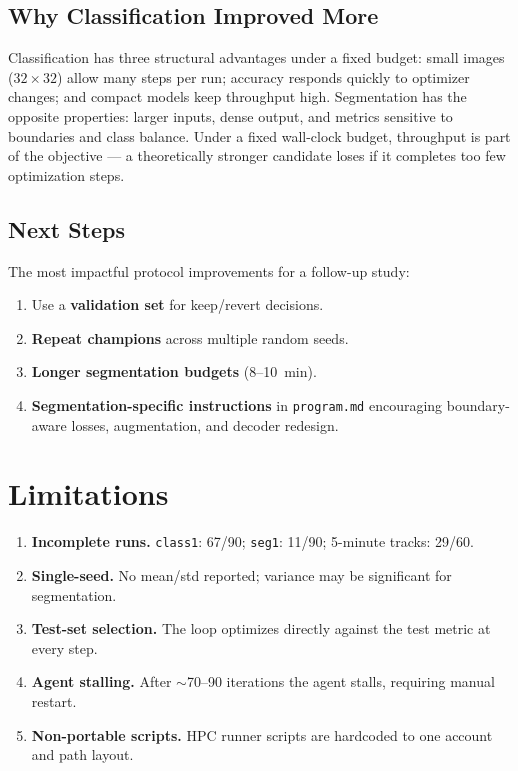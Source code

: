 \documentclass[10pt,twocolumn,letterpaper]{article}
\begin{document}
\subsection{Why Classification Improved More}

Classification has three structural advantages under a fixed budget:
small images ($32\times32$) allow many steps per run; accuracy
responds quickly to optimizer changes; and compact models keep
throughput high.
Segmentation has the opposite properties: larger inputs, dense output,
and metrics sensitive to boundaries and class balance.
Under a fixed wall-clock budget, throughput is part of the objective
--- a theoretically stronger candidate loses if it completes too few
optimization steps.

\subsection{Next Steps}

The most impactful protocol improvements for a follow-up study:
\begin{enumerate}
  \item Use a \textbf{validation set} for keep/revert decisions.
  \item \textbf{Repeat champions} across multiple random seeds.
  \item \textbf{Longer segmentation budgets} (8--10~min).
  \item \textbf{Segmentation-specific instructions} in
    \texttt{program.md} encouraging boundary-aware losses,
    augmentation, and decoder redesign.
\end{enumerate}

\section{Limitations}

\begin{enumerate}
  \item \textbf{Incomplete runs.}
    \texttt{class1}: 67/90; \texttt{seg1}: 11/90;
    5-minute tracks: 29/60.
  \item \textbf{Single-seed.} No mean/std reported; variance may be
    significant for segmentation.
  \item \textbf{Test-set selection.} The loop optimizes directly
    against the test metric at every step.
  \item \textbf{Agent stalling.} After $\sim$70--90 iterations the
    agent stalls, requiring manual restart.
  \item \textbf{Non-portable scripts.} HPC runner scripts are
    hardcoded to one account and path layout.
\end{enumerate}
\end{document}
